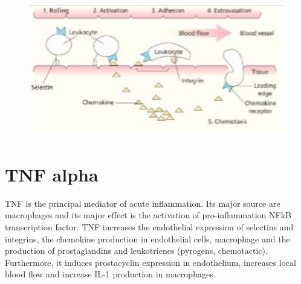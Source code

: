 \begin{figure}[h]
\includegraphics[width=1\textwidth]{leuko}
\caption{\label{fig:leuko}}
\end{figure}
 
\section{TNF alpha}
TNF is the principal mediator of acute inflammation.
Its major source are macrophages and its major effect is the activation of pro-inflammation NFkB transcription factor.
TNF increases the endothelial expression of selectins and integrins, the chemokine production in endothelial cells, macrophage and the production of prostaglandins and leukotrienes (pyrogens, chemotactic). 
Furthermore, it induces prostacyclin expression in endothelium, increases local blood flow and increase IL-1 production in macrophages.

